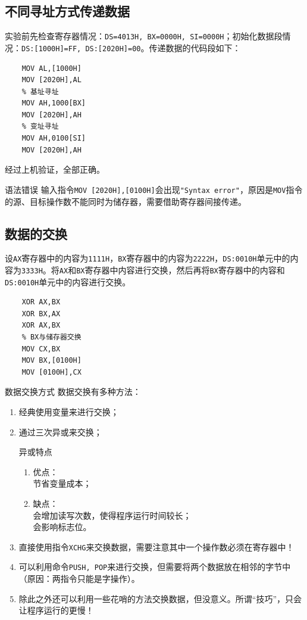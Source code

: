 \documentclass[11pt]{SEU-Digital-Report}
\begin{document}
\subsection{不同寻址方式传递数据}
实验前先检查寄存器情况：\texttt{DS=4013H, BX=0000H, SI=0000H}；初始化数据段情况：\texttt{DS:[1000H]=FF, DS:[2020H]=00}。传递数据的代码段如下：
\begin{lstlisting}[language={[x86masm]Assembler},title=code]
    % 直接寻址
    MOV AL,[1000H]
    MOV [2020H],AL
    % 基址寻址
    MOV AH,1000[BX]
    MOV [2020H],AH
    % 变址寻址
    MOV AH,0100[SI]
    MOV [2020H],AH
\end{lstlisting}
经过上机验证，全部正确。
\begin{note}{语法错误}{}
    输入指令\texttt{MOV [2020H],[0100H]}会出现\texttt{"Syntax error"}，原因是\texttt{MOV}指令的源、目标操作数不能同时为储存器，需要借助寄存器间接传递。
\end{note}

\subsection{数据的交换}
设\texttt{AX}寄存器中的内容为\texttt{1111H}，\texttt{BX}寄存器中的内容为\texttt{2222H}，\texttt{DS:0010H}单元中的内容为\texttt{3333H}。将\texttt{AX}和\texttt{BX}寄存器中内容进行交换，然后再将\texttt{BX}寄存器中的内容和\texttt{DS:0010H}单元中的内容进行交换。
\begin{lstlisting}[language={[x86masm]Assembler},title=code]
    % AX与BX交换
    XOR AX,BX
    XOR BX,AX
    XOR AX,BX
    % BX与储存器交换
    MOV CX,BX
    MOV BX,[0100H]
    MOV [0100H],CX
\end{lstlisting}
\begin{analyze}{数据交换方式}{}
    数据交换有多种方法：
    \begin{enumerate}
        \item 经典使用变量来进行交换；
        \item 通过三次异或来交换；
        \begin{idea}{异或特点}{}
            \begin{enumerate}
                \item 优点：\\节省变量成本；
                \item 缺点：\\会增加读写次数，使得程序运行时间较长；\\会影响标志位。
            \end{enumerate}
        \end{idea}
        \item 直接使用指令\texttt{XCHG}来交换数据，需要注意其中一个操作数必须在寄存器中！
        \item 可以利用命令\texttt{PUSH, POP}来进行交换，但需要将两个数据放在相邻的字节中（原因：两指令只能是字操作）。
        \item 除此之外还可以利用一些花哨的方法交换数据，但没意义。所谓“技巧”，只会让程序运行的更慢！
    \end{enumerate}
\end{analyze}
\end{document}
